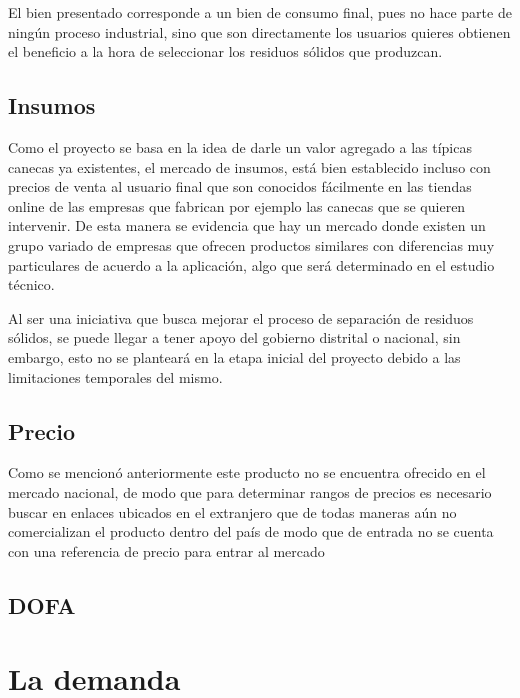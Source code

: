 \documentclass{report}
\begin{document}
    El bien presentado corresponde a un bien de consumo final, pues no hace parte de ningún proceso industrial, sino que son directamente los usuarios quieres obtienen el beneficio a la hora de seleccionar los residuos sólidos que produzcan.
    
    \section{Insumos}
    
    Como el proyecto se basa en la idea de darle un valor agregado a las típicas canecas ya existentes, el mercado de insumos, está bien establecido incluso con precios de venta al usuario final que son conocidos fácilmente en las tiendas online de las empresas que fabrican por ejemplo las canecas que se quieren intervenir. De esta manera se evidencia que hay un mercado donde existen un grupo variado de empresas que ofrecen productos similares con diferencias muy particulares de acuerdo a la aplicación, algo que será determinado en el estudio técnico.
    
    Al ser una iniciativa que busca mejorar el proceso de separación de residuos sólidos, se puede llegar a tener apoyo del gobierno distrital o nacional, sin embargo, esto no se planteará en la etapa inicial del proyecto debido a las limitaciones temporales del mismo.
    
    \section{Precio}
Como se mencionó anteriormente este producto no se encuentra ofrecido en el mercado nacional, de modo que para determinar rangos de precios es necesario buscar en enlaces ubicados en el extranjero que de todas maneras aún no comercializan el producto dentro del país de modo que de entrada no se cuenta con una referencia de precio para entrar al mercado
    
    \section{DOFA}

\chapter{La demanda}
    
\end{document}
